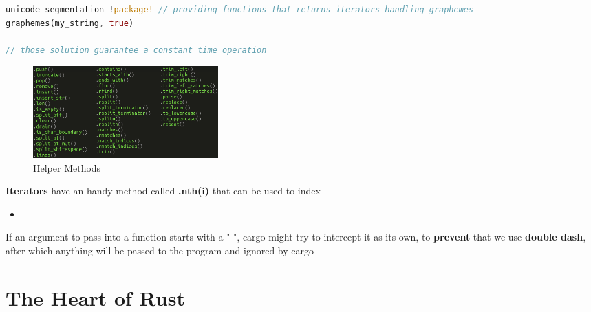 \documentclass{report}
\begin{document}
\begin{multicols*}{2}
\begin{tcolorbox}[title=When presented with a string,colback=backcolour,size=small,left=4mm]
\begin{lstlisting}[language=rust]
unicode-segmentation !package! // providing functions that returns iterators handling graphemes 
graphemes(my_string, true)

// those solution guarantee a constant time operation
\end{lstlisting}
\end{tcolorbox}

\begin{figure}[H] 
	 \centering 
	 \includegraphics[width=2.8in]{screenshots/2022-07-15T23-46-36Z.png} 
	 \caption{Helper Methods} 
 \end{figure}

 \textbf{Iterators} have an handy method called \textbf{.nth(i)} that can be used to index

 \begin{itemize}
   \item {}
 \end{itemize}


\begin{tcolorbox}[colback=red!5!white,colframe=red!75!black,size=small]
If an argument to pass into a function starts with a "-", cargo might try to intercept it as its own, to \textbf{prevent} that we use \textbf{double dash}, after which anything will be passed to the
program and ignored by cargo
\end{tcolorbox}


\end{multicols*}

\chapter{The Heart of Rust}
\end{document}
